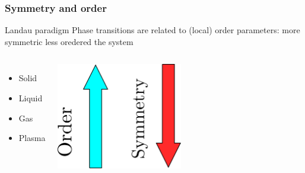 \begin{frame}

    \frametitle{Symmetry and order}
    \begin{block}{Landau paradigm}
        Phase transitions are related to (local) order parameters:
        more symmetric less oredered the system
    \end{block}

    \begin{columns}
    \begin{itemize}
        \item Solid
        \item Liquid
        \item Gas
        \item Plasma
    \end{itemize}
        \includegraphics[width=0.5\textwidth]{phases_of_matter/setas_order_symmetry.png}
    \end{columns}

\end{frame}

